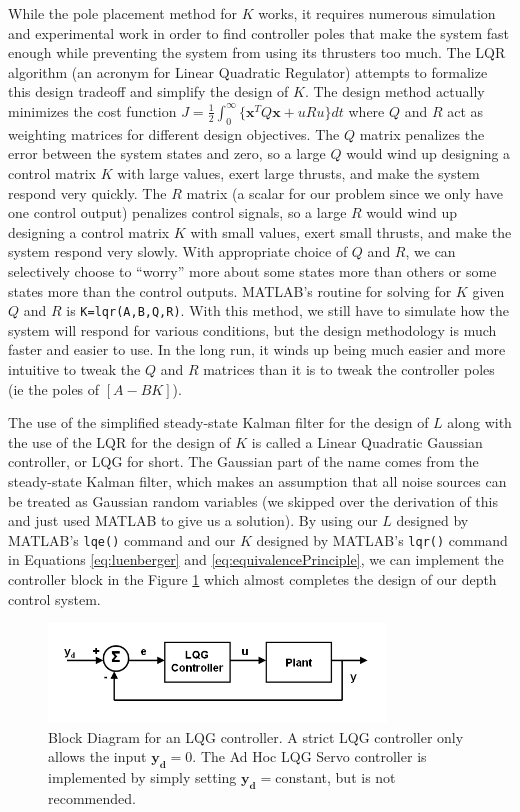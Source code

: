 \documentclass{article}
\begin{document}
While the pole placement method for $K$ works, it requires numerous simulation and experimental work in order to find controller poles that make the system fast enough while preventing the system from using its thrusters too much.  The LQR algorithm (an acronym for Linear Quadratic Regulator) attempts to formalize this design tradeoff and simplify the design of $K$.  The design method actually minimizes the cost function $J=\frac{1}{2}\int_{0}^{\infty}\{\pmb{x}^TQ\pmb{x}+uRu\}dt$ where $Q$ and $R$ act as weighting matrices for different design objectives.  The $Q$ matrix penalizes the error between the system states and zero, so a large $Q$ would wind up designing a control matrix $K$ with large values, exert large thrusts, and make the system respond very quickly.  The $R$ matrix (a scalar for our problem since we only have one control output) penalizes control signals, so a large $R$ would wind up designing a control matrix $K$ with small values, exert small thrusts, and make the system respond very slowly.  With appropriate choice of $Q$ and $R$, we can selectively choose to ``worry'' more about some states more than others or some states more than the control outputs.  MATLAB's routine for solving for $K$ given $Q$ and $R$ is \verb+K=lqr(A,B,Q,R)+.  With this method, we still have to simulate how the system will respond for various conditions, but the design methodology is much faster and easier to use.  In the long run, it winds up being much easier and more intuitive to tweak the $Q$ and $R$ matrices than it is to tweak the controller poles (ie the poles of $[A-BK]$).

The use of the simplified steady-state Kalman filter for the design of $L$ along with the use of the LQR for the design of $K$ is called a Linear Quadratic Gaussian controller, or LQG for short.  The Gaussian part of the name comes from the steady-state Kalman filter, which makes an assumption that all noise sources can be treated as Gaussian random variables (we skipped over the derivation of this and just used MATLAB to give us a solution).  By using our $L$ designed by MATLAB's \verb+lqe()+ command and our $K$ designed by MATLAB's \verb+lqr()+ command in Equations \ref{eq:luenberger} and \ref{eq:equivalencePrinciple}, we can implement the controller block in the Figure \ref{fig:LQGBlockDiagram} which almost completes the design of our depth control system.

\begin{figure}[h]
\includegraphics[width=0.8\textwidth]{LQGBlockDiagram.png}
\centering
\caption{Block Diagram for an LQG controller.  A strict LQG controller only allows the input $\pmb{y_d}=0$.  The Ad Hoc LQG Servo controller is implemented by simply setting $\pmb{y_d}=$constant, but is not recommended.}
\label{fig:LQGBlockDiagram}
\end{figure}
\end{document}
